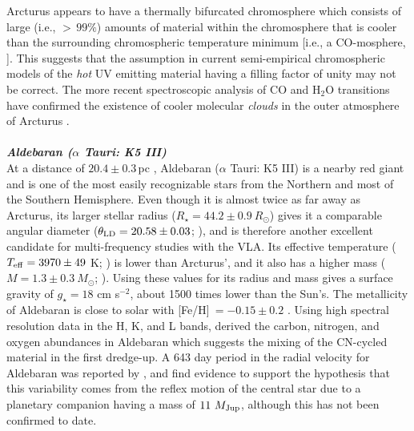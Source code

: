 Arcturus appears to have a thermally bifurcated chromosphere which consists of large (i.e., $>\,99\%$) amounts of material within the chromosphere that is cooler than the surrounding chromospheric temperature minimum [i.e., a CO-mosphere, \cite{wiedemann_1994}]. This suggests that the assumption in current semi-empirical chromospheric models of the \textit{hot} UV emitting material having a filling factor of unity may not be correct. The more recent spectroscopic analysis of CO and H$_{2}$O transitions have confirmed the existence of cooler molecular \textit{clouds} in the outer atmosphere of Arcturus \citep{ryde_2002,tsuji_2009}. 
\\
\\
\textbf{\textit{Aldebaran ($\alpha$ Tauri: K5 III)}}\\
At a distance of $20.4 \pm 0.3$\,pc \citep{van_leeuwen_2007}, Aldebaran ($\alpha$ Tauri: K5 III) is a nearby red giant and is one of the most easily recognizable stars from the Northern and most of the Southern Hemisphere. Even though it is almost twice as far away as Arcturus, its larger stellar radius ($R_{\star}=44.2 \pm 0.9 \ R_{\odot}$) gives it a comparable angular diameter ($\theta _{\rm{LD}}=20.58\pm0.03$; \citealt{richichi_2005}), and is therefore another excellent candidate for multi-frequency studies with the VLA. Its effective temperature ($T_{\rm{eff}}=3970 \pm 49$ K; \citealt{di_benedetto_1993}) is lower than Arcturus', and it also has a higher mass ($M=1.3 \pm 0.3 \ M_{\odot}$; \citealt{lebzelter_2012}). Using these values for its radius and mass gives a surface gravity of $g_{\star}= 18$ cm s$^{-2}$, about 1500 times lower than the Sun's. The metallicity of Aldebaran is close to solar with [Fe/H]$\ = - 0.15 \pm 0.2$ \citep{decin_2003}. Using high spectral resolution data in the H, K, and L bands, \cite{tsuji_2008} derived the carbon, nitrogen, and oxygen abundances in Aldebaran which suggests the mixing of the CN-cycled material in the first dredge-up. A 643 day period in the radial velocity for Aldebaran was reported by \cite{hatzes_1993}, and \cite{hatzes_1998} find evidence to support the hypothesis that this variability comes from the reflex motion of the central star due to a planetary companion having a mass of $11 \ M_{\rm{Jup}}$, although this has not been confirmed to date.

